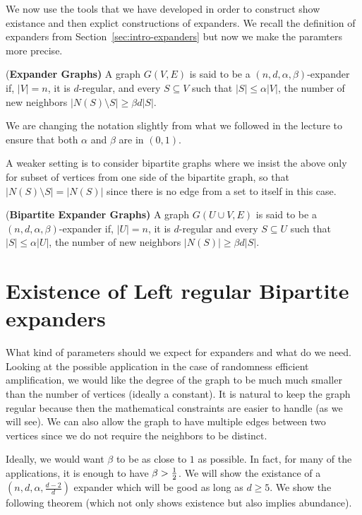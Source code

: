 
We now use the tools that we have developed in order to construct show existance and then explict constructions of expanders. We recall the definition of expanders from Section~\ref{sec:intro-expanders} but now we make the paramters more precise.

\begin{definition}{(\bf Expander Graphs)}
A graph $G(V,E)$ is said to be a $(n,d,\alpha,\beta)$-expander if, $|V|=n$, it is $d$-regular, and every $S \subseteq V$ such that $|S| \le \alpha|V|$, the number of new neighbors $|N(S)\setminus S| \ge \beta d|S|$.
\end{definition}

 We are changing the notation slightly from what we followed in the lecture to ensure that both $\alpha$ and $\beta$ are in $(0,1)$.

\noindent A weaker setting is to consider bipartite graphs where we insist the above only for subset of vertices from one side of the bipartite graph, so that $|N(S)\setminus S| = |N(S)|$ since there is no edge from a set to itself in this case.

\begin{definition}{(\bf Bipartite Expander Graphs)}
A graph $G(U \cup V,E)$ is said to be a $(n,d,\alpha,\beta)$-expander if, $|U|=n$, it is $d$-regular and every $S \subseteq U$ such that $|S| \le \alpha|U|$, the number of new neighbors $|N(S)| \ge \beta d|S|$.
\end{definition}
\section{Existence of Left regular Bipartite expanders}

What kind of parameters should we expect for expanders and what do we need. Looking at the possible application in the case of randomness efficient amplification, we would like the degree of the graph to be much much smaller than the number of vertices (ideally a constant). It is natural to keep the graph regular because then the mathematical constraints are easier to handle (as we will see). We can also allow the graph to have multiple edges between two vertices since we do not require the neighbors to be distinct.

Ideally, we would want $\beta$ to be as close to $1$ as possible. In fact, for many of the applications, it is enough to have $\beta > \frac{1}{2}$. We will show the existance of a $(n,d,\alpha,\frac{d-2}{d})$ expander which will be good as long as $d \ge 5$. We show the following theorem (which not only shows existence but also implies abundance).


